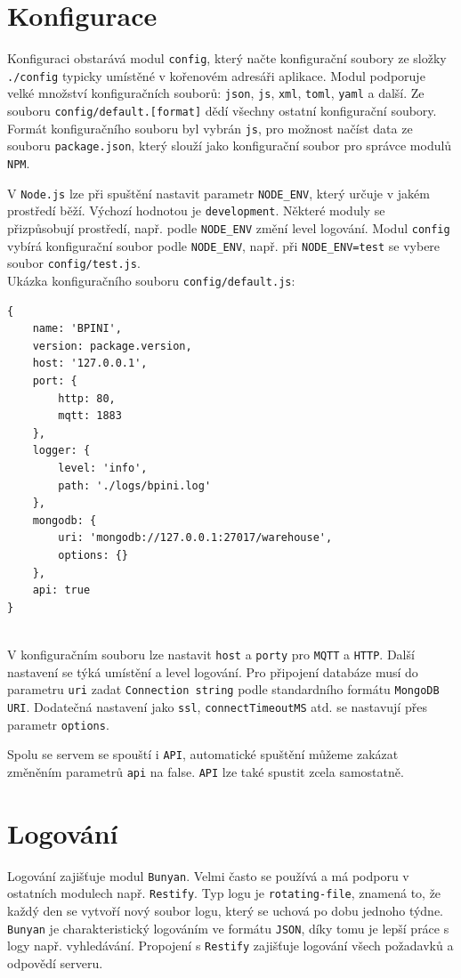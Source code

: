 \documentclass[czech,BP]{thesiskiv}
\begin{document}
	
	
\section{Konfigurace}
		Konfiguraci obstarává modul \texttt{config}, který načte konfigurační soubory ze složky \texttt{./config} typicky umístěné v kořenovém adresáři aplikace. 	
		Modul podporuje velké množství konfiguračních souborů: \texttt{json}, \texttt{js}, \texttt{xml}, \texttt{toml}, \texttt{yaml} a další.
		Ze souboru \texttt{config/default.[format]} dědí všechny ostatní konfigurační soubory.
		Formát konfiguračního souboru byl vybrán \texttt{js}, pro možnost načíst data ze souboru \texttt{package.json}, který slouží jako konfigurační soubor pro správce modulů \texttt{NPM}.	
			
		V \texttt{Node.js} lze při spuštění nastavit parametr \texttt{NODE\_ENV}, který určuje v jakém prostředí běží. Výchozí hodnotou je \texttt{development}.
		Některé moduly se přizpůsobují prostředí, např. podle \texttt{NODE\_ENV} změní level logování. 
		Modul \texttt{config} vybírá konfigurační soubor podle \texttt{NODE\_ENV}, např. při \texttt{NODE\_ENV=test} se vybere soubor \texttt{config/test.js}.
\newpage
\ \\
		Ukázka konfiguračního souboru \texttt{config/default.js}:	
\begin{verbatim}
{
    name: 'BPINI',
    version: package.version,
    host: '127.0.0.1',
    port: {
        http: 80,
        mqtt: 1883
    },
    logger: {
        level: 'info',
        path: './logs/bpini.log'
    },
    mongodb: {
        uri: 'mongodb://127.0.0.1:27017/warehouse',
        options: {}
    },
    api: true
}
\end{verbatim}
\ \\
	V konfiguračním souboru lze nastavit  \texttt{host} a  \texttt{porty} pro \texttt{MQTT} a \texttt{HTTP}. Další nastavení se týká umístění a level logování. Pro připojení databáze musí do parametru \texttt{uri} zadat \texttt{Connection string} podle standardního formátu \texttt{MongoDB URI}. Dodatečná nastavení jako \texttt{ssl}, \texttt{connectTimeoutMS} atd. se nastavují přes parametr \texttt{options}. 
	
	Spolu se servem se spouští i \texttt{API}, automatické spuštění můžeme zakázat změněním parametrů \texttt{api} na false. \texttt{API} lze také spustit zcela samostatně.	
	
	
	\section{Logování}
	Logování zajišťuje modul \texttt{Bunyan}. Velmi často se používá a má podporu v ostatních modulech např. \texttt{Restify}.
	Typ logu je \texttt{rotating-file}, znamená to, že každý den se vytvoří nový soubor logu, který se uchová po dobu jednoho týdne.
	\texttt{Bunyan} je charakteristický logováním ve formátu \texttt{JSON}, díky tomu je lepší práce s logy např. vyhledávání.
	Propojení s \texttt{Restify} zajišťuje logování všech požadavků a odpovědí serveru. 
	
\end{document}
